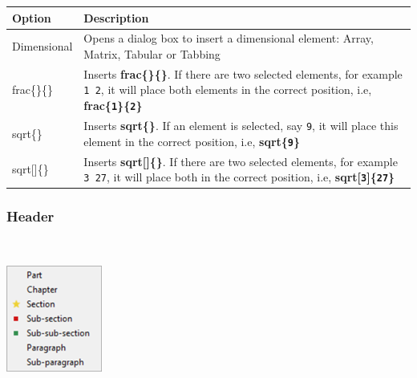 \begin{scriptsize}
  \begin{tabularx}{\textwidth}{>{\hsize=0.2\hsize}X>{\hsize=0.8\hsize}X}\\
    \hline \textbf{Option} & \textbf{Description} \\
    \hline
    Dimensional & Opens a dialog box to insert a dimensional element: Array, Matrix, Tabular or Tabbing \\
    \hline
    frac\{\}\{\} & Inserts \textbf{frac\{\}\{\}}. If there are two selected elements, for example \texttt{1 2}, it will place both elements in the correct position, i.e, \textbf{frac\{\texttt{1}\}\{\texttt{2}\}} \\
    sqrt\{\} & Inserts \textbf{sqrt\{\}}. If an element is selected, say \texttt{9}, it will place this element in the correct position, i.e, \textbf{sqrt\{\texttt{9}\}} \\
    sqrt[]\{\} & Inserts \textbf{sqrt[]\{\}}. If there are two selected elements, for example \texttt{3 27}, it will place both in the correct position, i.e, \textbf{sqrt[\texttt{3}]\{\texttt{27}\}} \\
    \hline
  \end{tabularx}
\end{scriptsize}


\newpage
\hypertarget{menu_insert_latex_header}{}
\subsubsection{Header}\\

\includegraphics[scale=0.50]{./res/menu_insert_latex_header.png}\\

